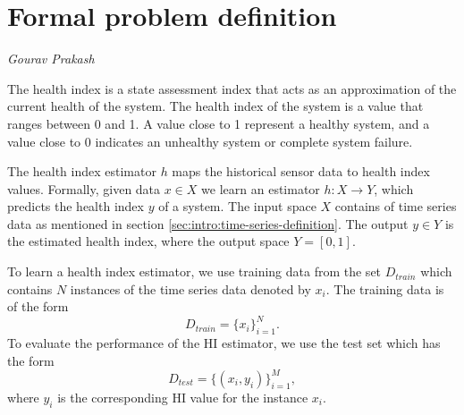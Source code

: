 

\newpage
\section{Formal problem definition}\label{sec:Fpd_HI}
\vspace*{-15mm}
\hfill{\normalsize\emph{Gourav Prakash}}
\label{sec:hi_estimation:formal_definiton}

The health index is a state assessment index that acts as an approximation  of the current health of the system. The
health index of the system is a value that ranges between 0  and 1. A value close to 1 represent a healthy system,
and a value close to 0 indicates an unhealthy system or complete system failure.

The health index estimator $h$ maps the historical sensor data to health index values.  Formally, given data $x\in X$
we learn an estimator $ h : X \rightarrow Y $, which predicts the health index $y$ of a system. The input space $X$
contains of time series data as mentioned in section \ref{sec:intro:time-series-definition}. The output $y \in Y$ is
the estimated health index, where the output space $Y = [0,1] $.

To learn a health index estimator, we use training data from the set $D_{train}$ which contains $N$ instances of the
time series data denoted by $x_i$. The training data is of the form
\begin{equation}
    D_{train} = \{x_i\}_{i=1}^N.
\end{equation}
To evaluate the performance of the HI estimator, we use the test set
which has the form
\begin{equation}
    D_{test} = \{(x_i,y_i)\}_{i=1}^M ,
\end{equation}
where $y_i$ is the corresponding HI value for the instance
$x_i$.


